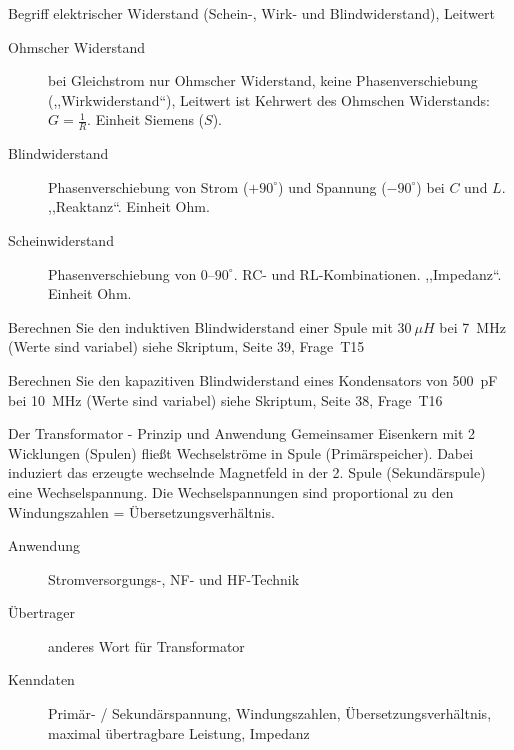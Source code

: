 \documentclass[avery5371,grid,frame,a4paper]{flashcards}
\newcommand{\card}[3]{
  \begin{flashcard}[{\chap} -- #1]{#2}#3\end{flashcard}
}
\begin{document}
\card{14}{Begriff elektrischer Widerstand (Schein-, Wirk- und Blindwiderstand), Leitwert}{
  \small
  \begin{description}
    \item[Ohmscher Widerstand] bei Gleichstrom nur Ohmscher Widerstand,
      keine Phasenverschiebung (,,Wirkwiderstand``),
      Leitwert ist Kehrwert des Ohmschen Widerstands: $G = \frac1{R}$. Einheit Siemens ($S$).
    \item[Blindwiderstand]
      Phasenverschiebung von Strom ($+90^\circ$) und Spannung ($-90^\circ$) bei $C$ und $L$.
      ,,Reaktanz``. Einheit Ohm.
    \item[Scheinwiderstand]
      Phasenverschiebung von 0--$90^\circ$. RC- und RL-Kombinationen. ,,Impedanz``. Einheit Ohm.
  \end{description}
}

\card{15}{Berechnen Sie den induktiven Blindwiderstand einer Spule mit $30~\mu H$ bei 7~MHz (Werte sind variabel)}{
  \centering
  siehe Skriptum, Seite 39, Frage~T15
}

\card{16}{Berechnen Sie den kapazitiven Blindwiderstand eines Kondensators von 500~pF bei 10~MHz (Werte sind variabel)}{
  \centering
  siehe Skriptum, Seite 38, Frage~T16
}

\card{17}{Der Transformator - Prinzip und Anwendung}{
  \footnotesize
  Gemeinsamer Eisenkern mit 2 Wicklungen (Spulen) fließt Wechselströme in Spule (Primärspeicher).
  Dabei induziert das erzeugte wechselnde Magnetfeld in der 2. Spule (Sekundärspule)
  eine Wechselspannung. Die Wechselspannungen sind proportional zu den Windungszahlen
  = Übersetzungsverhältnis.
  \begin{description}
    \item[Anwendung] Stromversorgungs-, NF- und HF-Technik
    \item[Übertrager] anderes Wort für Transformator
    \item[Kenndaten]
      Primär- / Sekundärspannung, Windungszahlen, Übersetzungsverhältnis,
      maximal übertragbare Leistung, Impedanz
  \end{description}
}
\end{document}
